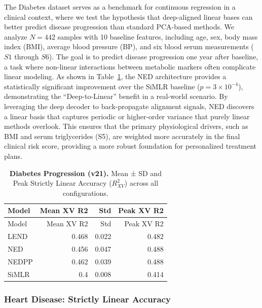 \documentclass[
  letterpaper,
]{report}
\begin{document}
The Diabetes dataset serves as a benchmark for continuous regression in
a clinical context, where we test the hypothesis that deep-aligned
linear bases can better predict disease progression than standard
PCA-based methods. We analyze \(N=442\) samples with 10 baseline
features, including age, sex, body mass index (BMI), average blood
pressure (BP), and six blood serum measurements (\(S1\) through \(S6\)).
The goal is to predict disease progression one year after baseline, a
task where non-linear interactions between metabolic markers often
complicate linear modeling. As shown in
Table~\ref{tbl-diabetes-results}, the NED architecture provides a
statistically significant improvement over the SiMLR baseline
(\(p = 3 \times 10^{-4}\)), demonstrating the ``Deep-to-Linear'' benefit
in a real-world scenario. By leveraging the deep decoder to
back-propagate alignment signals, NED discovers a linear basis that
captures periodic or higher-order variance that purely linear methods
overlook. This ensures that the primary physiological drivers, such as
BMI and serum triglycerides (S5), are weighted more accurately in the
final clinical risk score, providing a more robust foundation for
personalized treatment plans.

\begin{longtable}[]{@{}lrrr@{}}
\caption{\textbf{Diabetes Progression (v21).} Mean ± SD and Peak
Strictly Linear Accuracy (\(R^2_{XV}\)) across all
configurations.}\label{tbl-diabetes-results}\tabularnewline
\toprule\noalign{}
Model & Mean XV R2 & Std & Peak XV R2 \\
\midrule\noalign{}
\endfirsthead
\toprule\noalign{}
Model & Mean XV R2 & Std & Peak XV R2 \\
\midrule\noalign{}
\endhead
\bottomrule\noalign{}
\endlastfoot
LEND & 0.468 & 0.022 & 0.482 \\
NED & 0.456 & 0.047 & 0.488 \\
NEDPP & 0.462 & 0.039 & 0.488 \\
SiMLR & 0.4 & 0.008 & 0.414 \\
\end{longtable}

\subsubsection{Heart Disease: Strictly Linear
Accuracy}\label{heart-disease-strictly-linear-accuracy}
\end{document}
